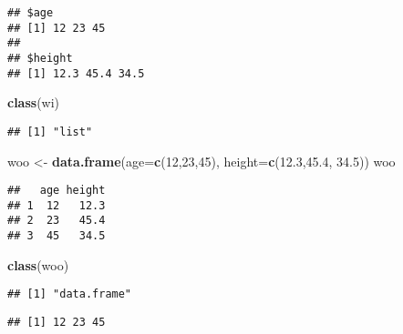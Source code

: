 \documentclass[
]{article}
\newenvironment{Shaded}{\begin{snugshade}}{\end{snugshade}}
\newcommand{\AttributeTok}[1]{\textcolor[rgb]{0.13,0.29,0.53}{#1}}
\newcommand{\CommentTok}[1]{\textcolor[rgb]{0.56,0.35,0.01}{\textit{#1}}}
\newcommand{\DecValTok}[1]{\textcolor[rgb]{0.00,0.00,0.81}{#1}}
\newcommand{\FloatTok}[1]{\textcolor[rgb]{0.00,0.00,0.81}{#1}}
\newcommand{\FunctionTok}[1]{\textcolor[rgb]{0.13,0.29,0.53}{\textbf{#1}}}
\newcommand{\NormalTok}[1]{#1}
\newcommand{\OtherTok}[1]{\textcolor[rgb]{0.56,0.35,0.01}{#1}}
\newcommand{\SpecialCharTok}[1]{\textcolor[rgb]{0.81,0.36,0.00}{\textbf{#1}}}
\begin{document}
\begin{verbatim}
## $age
## [1] 12 23 45
## 
## $height
## [1] 12.3 45.4 34.5
\end{verbatim}

\begin{Shaded}
\begin{Highlighting}[]
\FunctionTok{class}\NormalTok{(wi)}
\end{Highlighting}
\end{Shaded}

\begin{verbatim}
## [1] "list"
\end{verbatim}

\begin{Shaded}
\begin{Highlighting}[]
\NormalTok{woo }\OtherTok{\textless{}{-}} \FunctionTok{data.frame}\NormalTok{(}\AttributeTok{age=}\FunctionTok{c}\NormalTok{(}\DecValTok{12}\NormalTok{,}\DecValTok{23}\NormalTok{,}\DecValTok{45}\NormalTok{), }\AttributeTok{height=}\FunctionTok{c}\NormalTok{(}\FloatTok{12.3}\NormalTok{,}\FloatTok{45.4}\NormalTok{, }\FloatTok{34.5}\NormalTok{))}
\NormalTok{woo}
\end{Highlighting}
\end{Shaded}

\begin{verbatim}
##   age height
## 1  12   12.3
## 2  23   45.4
## 3  45   34.5
\end{verbatim}

\begin{Shaded}
\begin{Highlighting}[]
\FunctionTok{class}\NormalTok{(woo)}
\end{Highlighting}
\end{Shaded}

\begin{verbatim}
## [1] "data.frame"
\end{verbatim}

\begin{Shaded}
\end{Shaded}

\begin{verbatim}
## [1] 12 23 45
\end{verbatim}

\begin{Shaded}
\end{Shaded}
\end{document}
